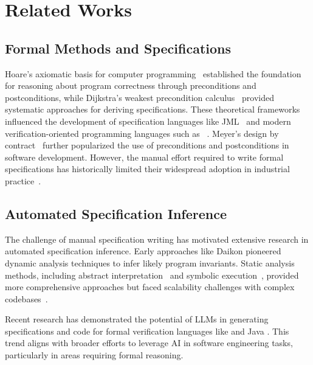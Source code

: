 \section{Related Works}
\subsection{Formal Methods and Specifications}
Hoare's axiomatic basis for computer programming~\cite{hoare1969axiomatic} established the foundation for reasoning about program correctness through preconditions and postconditions, while Dijkstra's weakest precondition calculus~\cite{dijkstra1976discipline} provided systematic approaches for deriving specifications. These theoretical frameworks influenced the development of specification languages like JML~\cite{leavens2008jml} and modern verification-oriented programming languages such as ~\cite{leino2010Dafny}. Meyer's design by contract~\cite{meyer1992design} further popularized the use of preconditions and postconditions in software development. However, the manual effort required to write formal specifications has historically limited their widespread adoption in industrial practice~\cite{woodcock2009formal}.

\subsection{Automated Specification Inference}
The challenge of manual specification writing has motivated extensive research in automated specification inference. Early approaches like Daikon pioneered dynamic analysis techniques to infer likely program invariants\cite{ernst2007daikon}.
Static analysis methods, including abstract interpretation~\cite{cousot1977abstract} and symbolic execution~\cite{king1976symbolic}, provided more comprehensive approaches but faced scalability challenges with complex codebases~\cite{calcagno2011compositional}.

Recent research has demonstrated the potential of LLMs in generating specifications and code for formal verification languages like  \cite{misu2024towards} and Java \cite{ma2024specgen}. This trend aligns with broader efforts to leverage AI in software engineering tasks, particularly in areas requiring formal reasoning.


